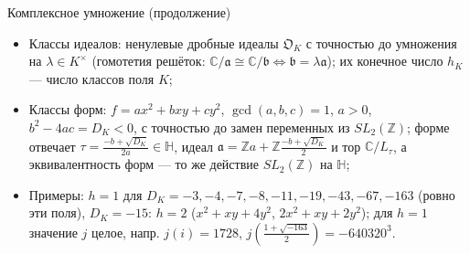 \documentclass[serif, aspectratio=169]{beamer}
\begin{document}
\begin{frame}{Комплексное умножение (продолжение)}
{\begin{itemize}
            \item Классы идеалов: ненулевые дробные идеалы $\mathfrak{O}_K$ с точностью до умножения на $\lambda\in K^\times$ (гомотетия решёток: $\mathbb{C}/\mathfrak{a}\cong\mathbb{C}/\mathfrak{b}\Leftrightarrow\mathfrak{b}=\lambda\mathfrak{a}$); их конечное число $h_K$ --- число классов поля $K$;
            \item Классы форм: $f=ax^2+bxy+cy^2$, $\gcd(a,b,c)=1$, $a>0$, $b^2-4ac=D_K<0$, с точностью до замен переменных из $SL_2(\mathbb{Z})$; форме отвечает $\tau=\frac{-b+\sqrt{D_K}}{2a}\in\mathbb{H}$, идеал $\mathfrak{a}=\mathbb{Z}a+\mathbb{Z}\frac{-b+\sqrt{D_K}}{2}$ и тор $\mathbb{C}/L_\tau$, а эквивалентность форм --- то же действие $SL_2(\mathbb{Z})$ на $\mathbb{H}$;
            \item Примеры: $h=1$ для $D_K=-3,-4,-7,-8,-11,-19,-43,-67,-163$ (ровно эти поля), $D_K=-15$: $h=2$ ($x^2+xy+4y^2$, $2x^2+xy+2y^2$); для $h=1$ значение $j$ целое, напр. $j(i)=1728$, $j\!\left(\frac{1+\sqrt{-163}}2\right)=-640320^3$.
        \end{itemize}
    }
\end{frame}
\end{document}
